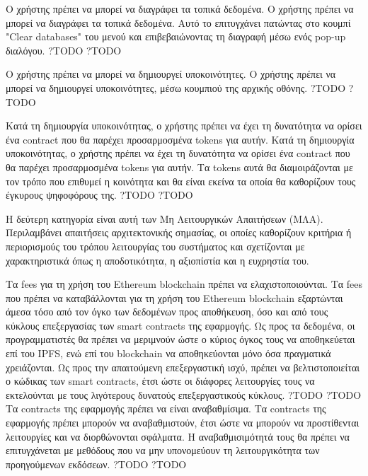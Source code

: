 \begin{enumerate}[label=\textbf{<ΛΑ-\arabic*>}, leftmargin=\parindent, align=left, labelwidth=\parindent, labelsep=0pt]
	\sysReqItem
		{\label{srs:functional-srs-delete-local-data}}
		{Ο χρήστης πρέπει να μπορεί να διαγράφει τα τοπικά δεδομένα.}
		{Ο χρήστης πρέπει να μπορεί να διαγράφει τα τοπικά δεδομένα. Αυτό το επιτυγχάνει πατώντας στο κουμπί "Clear databases" του μενού και επιβεβαιώνοντας τη διαγραφή μέσω ενός pop-up διαλόγου.}
		{?}{TODO}
		{?}{TODO}

	\sysReqItem
		{\label{srs:functional-srs-create-communities}}
		{Ο χρήστης πρέπει να μπορεί να δημιουργεί υποκοινότητες.}
		{Ο χρήστης πρέπει να μπορεί να δημιουργεί υποκοινότητες, μέσω κουμπιού της αρχικής οθόνης.}
		{?}{TODO}
		{?}{TODO}

	\sysReqItem
		{\label{srs:functional-srs-assign-community-contract}}
		{Κατά τη δημιουργία υποκοινότητας, ο χρήστης πρέπει να έχει τη δυνατότητα να ορίσει ένα contract που θα παρέχει προσαρμοσμένα tokens για αυτήν.}
		{Κατά τη δημιουργία υποκοινότητας, ο χρήστης πρέπει να έχει τη δυνατότητα να ορίσει ένα contract που θα παρέχει προσαρμοσμένα tokens για αυτήν. Τα tokens αυτά θα διαμοιράζονται με τον τρόπο που επιθυμεί η κοινότητα και θα είναι εκείνα τα οποία θα καθορίζουν τους έγκυρους ψηφοφόρους της.}
		{?}{TODO}
		{?}{TODO}
\end{enumerate}

Η δεύτερη κατηγορία είναι αυτή των Μη Λειτουργικών Απαιτήσεων (ΜΛΑ). Περιλαμβάνει απαιτήσεις αρχιτεκτονικής σημασίας, οι οποίες καθορίζουν κριτήρια ή περιορισμούς του τρόπου λειτουργίας του συστήματος και σχετίζονται με χαρακτηριστικά όπως η αποδοτικότητα, η αξιοπίστία και η ευχρηστία του.

\begin{enumerate}[label=\textbf{<ΜΛΑ-\arabic*>}, leftmargin=\parindent, align=left, labelwidth=\parindent, labelsep=0pt]
	\sysReqItem
		{\label{srs:non-functional-srs-minimize-fees}}
		{Τα fees για τη χρήση του Ethereum blockchain πρέπει να ελαχιστοποιούνται.}
		{Τα fees που πρέπει να καταβάλλονται για τη χρήση του Ethereum blockchain εξαρτώνται άμεσα τόσο από τον όγκο των δεδομένων προς αποθήκευση, όσο και από τους κύκλους επεξεργασίας των smart contracts της εφαρμογής. Ως προς τα δεδομένα, οι προγραμματιστές θα πρέπει να μεριμνούν ώστε ο κύριος όγκος τους να αποθηκεύεται επί του IPFS, ενώ επί του blockchain να αποθηκεύονται μόνο όσα πραγματικά χρειάζονται. Ως προς την απαιτούμενη επεξεργαστική ισχύ, πρέπει να βελτιστοποιείται ο κώδικας των smart contracts, έτσι ώστε οι διάφορες λειτουργίες τους να εκτελούνται με τους λιγότερους δυνατούς επεξεργαστικούς κύκλους.}
		{?}{TODO}
		{?}{TODO}
	\sysReqItem
		{\label{srs:non-functional-srs-upgrade-contracts}}
		{Τα contracts της εφαρμογής πρέπει να είναι αναβαθμίσιμα.}
		{Τα contracts της εφαρμογής πρέπει μπορούν να αναβαθμιστούν, έτσι ώστε να μπορούν να προστίθενται λειτουργίες και να διορθώνονται σφάλματα. Η αναβαθμισιμότητά τους θα πρέπει να επιτυγχάνεται με μεθόδους που να μην υπονομεύουν τη λειτουργικότητα των  προηγούμενων εκδόσεων.}
		{?}{TODO}
		{?}{TODO}
\end{enumerate}
